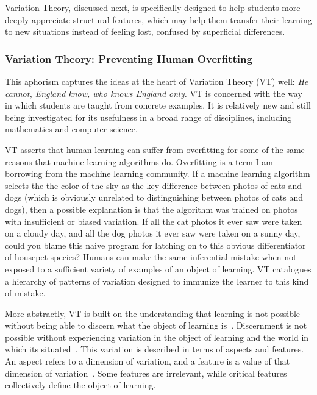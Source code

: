 Variation Theory, discussed next, is specifically designed to help students more deeply appreciate structural features, which may help them transfer their learning to new situations instead of feeling lost, confused by superficial differences.

\subsubsection{Variation Theory: Preventing Human Overfitting}

This aphorism captures the ideas at the heart of Variation Theory (VT) well: {\it He cannot, England know, who knows England only.} VT is concerned with the way in which students are taught from concrete examples. It is relatively new and still being investigated for its usefulness in a broad range of disciplines, including mathematics and computer science. 

VT asserts that human learning can suffer from overfitting for some of the same reasons that machine learning algorithms do. Overfitting is a term I am borrowing from the machine learning community. If a machine learning algorithm selects the the color of the sky as the key difference between photos of cats and dogs (which is obviously unrelated to distinguishing between photos of cats and dogs), then a possible explanation is that the algorithm was trained on photos with insufficient or biased variation. If all the cat photos it ever saw were taken on a cloudy day, and all the dog photos it ever saw were taken on a sunny day, could you blame this naive program for latching on to this obvious differentiator of housepet species? Humans can make the same inferential mistake when not exposed to a sufficient variety of examples of an object of learning. VT catalogues a hierarchy of patterns of variation designed to immunize the learner to this kind of mistake.

More abstractly, VT is built on the understanding that learning is not possible without being able to discern what the object of learning is~\cite{marton1997learning}. Discernment is not possible without experiencing variation in the object of learning and the world in which its situated~\cite{marton2004classroom}. This variation is described in terms of aspects and features. An aspect refers to a dimension of variation, and a feature is a value of that dimension of variation~\cite{ling2012variation}. Some features are irrelevant, while critical features collectively define the object of learning.

